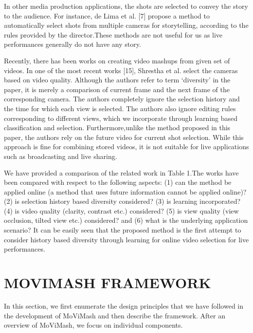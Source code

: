 \documentclass{sig-alternate}
\begin{document}
In other media production applications, the shots are selected to convey the story to the audience. For instance, de Lima et al. [7] propose a method to automatically select shots from multiple cameras for storytelling, according to the rules provided by the director.These methods are not useful for us as live performances generally do not have any story.

Recently, there has been works on creating video mashups from given set of videos. In one of the most recent works [15], Shrestha et al. select the cameras based on video quality. Although the authors refer to term ‘diversity’ in the paper, it is merely a comparison of current frame and the next frame of the corresponding camera. The authors completely ignore the selection history and the time for which each view is selected. The authors also ignore editing rules corresponding to different views, which we incorporate through learning based classification and selection. Furthermore,unlike the method proposed in this paper, the authors rely on the future video for current shot selection. While this approach is fine for combining stored videos, it is not suitable for live applications such as broadcasting and live sharing.

We have provided a comparison of the related work in Table 1.The works have been compared with respect to the following aspects: (1) can the method be applied online (a method that uses future information cannot be applied online)? (2) is selection history based diversity considered? (3) is learning incorporated? (4) is video quality (clarity, contrast etc.) considered? (5) is view quality (view occlusion, tilted view etc.) considered? and (6) what is the underlying application scenario? It can be easily seen that the proposed method is the first attempt to consider history based diversity through learning for online video selection for live performances.

\section{MOVIMASH FRAMEWORK}
In this section, we first enumerate the design principles that we have followed in the development of MoViMash and then describe the framework. After an overview of MoViMash, we focus on individual components.
\end{document}
